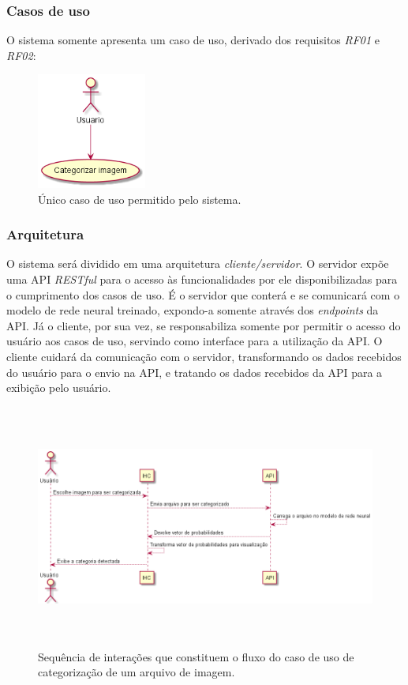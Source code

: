 \documentclass[12pt, a4paper]{article}
\begin{document}
\subsubsection{Casos de uso}
O sistema somente apresenta um caso de uso, derivado dos requisitos \emph{RF01} e \emph{RF02}:

\begin{figure}[H]
	\centering
	\includegraphics[width=\textwidth, height=3.8cm, keepaspectratio=true]{diagrams/usecase/UseCase}
	\caption{Único caso de uso permitido pelo sistema.}
\end{figure}

\subsubsection{Arquitetura}
O sistema será dividido em uma arquitetura \emph{cliente/servidor}. O servidor expõe uma API \emph{RESTful} para o acesso às funcionalidades por ele disponibilizadas para o cumprimento dos casos de uso. É o servidor que conterá e se comunicará com o modelo de rede neural treinado, expondo-a somente através dos \emph{endpoints} da API. Já o cliente, por sua vez, se responsabiliza somente por permitir o acesso do usuário aos casos de uso, servindo como interface para a utilização da API. O cliente cuidará da comunicação com o servidor, transformando os dados recebidos do usuário para o envio na API, e tratando os dados recebidos da API para a exibição pelo usuário.

\begin{figure}[H]
	\centering
	\includegraphics[width=\textwidth, height=8cm, keepaspectratio=true]{diagrams/sequence/Seq}
	\caption{Sequência de interações que constituem o fluxo do caso de uso de categorização de um arquivo de imagem.}
\end{figure}
\end{document}
